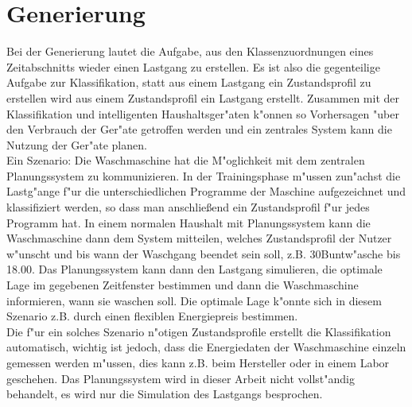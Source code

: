 \section{Generierung}
\label{Generierung}
Bei der Generierung lautet die Aufgabe, aus den Klassenzuordnungen eines Zeitabschnitts wieder einen Lastgang zu erstellen. Es ist also die gegenteilige Aufgabe zur Klassifikation, statt aus einem Lastgang ein Zustandsprofil zu erstellen wird aus einem Zustandsprofil ein Lastgang erstellt.
Zusammen mit der Klassifikation und intelligenten Haushaltsger"aten k"onnen so Vorhersagen "uber den Verbrauch der Ger"ate getroffen werden und ein zentrales System kann die Nutzung der Ger"ate planen. \\

Ein Szenario: Die Waschmaschine hat die M"oglichkeit mit dem zentralen Planungssystem zu kommunizieren. In der Trainingsphase m"ussen zun"achst die Lastg"ange f"ur die unterschiedlichen Programme der Maschine aufgezeichnet und klassifiziert werden, so dass man anschlie{\ss}end ein Zustandsprofil f"ur jedes Programm hat. In einem normalen Haushalt mit Planungssystem kann die Waschmaschine dann dem System mitteilen, welches Zustandsprofil der Nutzer w"unscht und bis wann der Waschgang beendet sein soll, z.B. 30\celsius Buntw"asche bis 18.00. Das Planungssystem kann dann den Lastgang simulieren, die optimale Lage im gegebenen Zeitfenster bestimmen und dann die Waschmaschine informieren, wann sie waschen soll.
Die optimale Lage k"onnte sich in diesem Szenario z.B. durch einen flexiblen Energiepreis bestimmen. \\

Die f"ur ein solches Szenario n"otigen Zustandsprofile erstellt die Klassifikation automatisch, wichtig ist jedoch, dass die Energiedaten der Waschmaschine einzeln gemessen werden m"ussen, dies kann z.B. beim Hersteller oder in einem Labor geschehen. Das Planungssystem wird in dieser Arbeit nicht vollst"andig behandelt, es wird nur die Simulation des Lastgangs besprochen. \\

